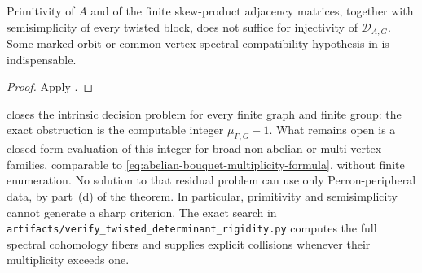 \begin{corollary}
  \label{cor:mixing-semisimplicity-not-enough}
  Primitivity of \(A\) and of the finite skew-product adjacency matrices,
  together with semisimplicity of every twisted block, does not suffice for
  injectivity of \(\mathscr D_{A,G}\).  Some marked-orbit or common
  vertex-spectral compatibility hypothesis in
   is indispensable.
\end{corollary}

\begin{proof}
  Apply .
\end{proof}

\begin{remark}
  \label{rem:inverse-rigidity-open-interface}
   closes the intrinsic
  decision problem for every finite graph and finite group: the exact
  obstruction is the computable integer \(\mu_{\Gamma,G}-1\).  What remains
  open is a closed-form evaluation of this integer for broad non-abelian or
  multi-vertex families, comparable to
  \eqref{eq:abelian-bouquet-multiplicity-formula}, without finite enumeration.
  No solution to that residual problem can use only Perron-peripheral data,
  by part~\textup{(d)} of the theorem.  In particular, primitivity and
  semisimplicity cannot generate a sharp criterion.  The exact search in
  \texttt{artifacts/verify\_twisted\_determinant\_rigidity.py} computes the
  full spectral cohomology fibers and supplies explicit collisions whenever
  their multiplicity exceeds one.
\end{remark}
